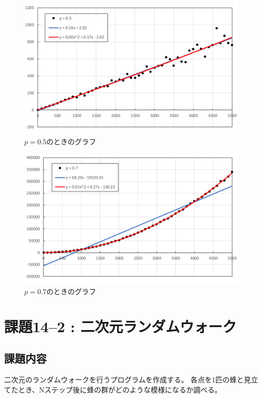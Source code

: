 \documentclass[a4j,titlepage]{jsarticle}
\begin{document}
\begin{figure}[H]
  \centering
  \includegraphics[width=13cm]{kadai14-1-5.png}
  \caption{$p=0.5$のときのグラフ}
  \label{fig:kekka14-1}
\end{figure}

\begin{figure}[H]
  \centering
  \includegraphics[width=13cm]{kadai14-1-7.png}
  \caption{$p=0.7$のときのグラフ}
  \label{fig:kekka14-1x}
\end{figure}


\section{課題14--2 : 二次元ランダムウォーク}
\subsection{課題内容}
二次元のランダムウォークを行うプログラムを作成する。
各点を1匹の蜂と見立てたとき、Nステップ後に蜂の群がどのような模様になるか調べる。
\end{document}

